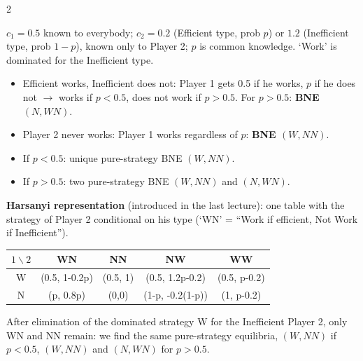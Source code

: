 \documentclass[a4paper,9pt]{extarticle}
\begin{document}
\begin{multicols}{2}
\begin{example}
$c_1 = 0.5$ known to everybody; $c_2 = 0.2$ (Efficient type, prob $p$) or $1.2$ (Inefficient
type, prob $1-p$), known only to Player 2; $p$ is common knowledge. `Work' is dominated for
the Inefficient type.

\begin{itemize}

\item Efficient works, Inefficient does not: Player 1 gets 0.5 if he works, $p$ if he does
not $\rightarrow$ works if $p < 0.5$, does not work if $p > 0.5$. For $p > 0.5$:
\textbf{BNE $(N, WN)$}.

\item Player 2 never works: Player 1 works regardless of $p$: \textbf{BNE $(W, NN)$}.

\end{itemize}

\end{example}


\begin{important}

\begin{itemize}

\item If $p < 0.5$: unique pure-strategy BNE $(W, NN)$.

\item If $p > 0.5$: two pure-strategy BNE $(W, NN)$ and $(N, WN)$.

\end{itemize}

\end{important}


\textbf{Harsanyi representation} (introduced in the last lecture): one table with the
strategy of Player 2 conditional on his type (`WN' = ``Work if efficient, Not Work if
Inefficient'').

\begin{center}
\footnotesize
\setlength{\tabcolsep}{3pt}
\begin{tabular}{c|cccc}
$1 \backslash 2$ & WN & NN & NW & WW \\
\hline
W & (0.5, 1-0.2p) & (0.5, 1) & (0.5, 1.2p-0.2) & (0.5, p-0.2) \\
N & (p, 0.8p) & (0,0) & (1-p, -0.2(1-p)) & (1, p-0.2) \\
\end{tabular}
\end{center}

After elimination of the dominated strategy W for the Inefficient Player 2, only WN and NN
remain: we find the same pure-strategy equilibria, $(W, NN)$ if $p < 0.5$, $(W, NN)$ and
$(N, WN)$ for $p > 0.5$.




\end{multicols}
\end{document}
